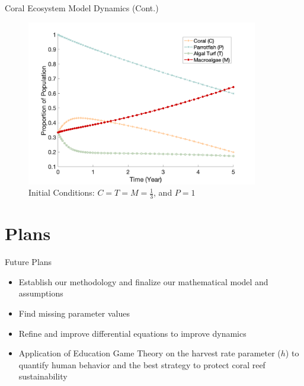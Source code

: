 \documentclass{beamer}
\begin{document}
\begin{frame}{Coral Ecosystem Model Dynamics (Cont.)}
    \begin{figure}
        \centering
        \includegraphics[width=0.9\textwidth]{Latex/Figures/initial_matlab_plot.png}
        \caption{Initial Conditions: $C = T = M = \frac{1}{3}$, and $P = 1$}
        \label{fig:my_label}
    \end{figure}
\end{frame}


\section{Plans}
\begin{frame}{Future Plans}
    \begin{itemize}
        \item Establish our methodology and finalize our mathematical model and assumptions
        \item Find missing parameter values
        \item Refine and improve differential equations to improve dynamics
        \item Application of Education Game Theory on the harvest rate parameter ($h$) to quantify human behavior and the best strategy to protect coral reef sustainability
    \end{itemize}
\end{frame}
\end{document}
